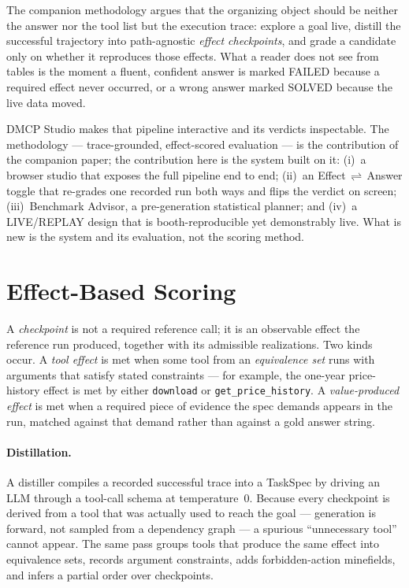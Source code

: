 \documentclass[letterpaper]{article} %
\begin{document}
The companion methodology \citep{dynamicmcpbench2026} argues that the organizing
object should be neither the answer nor the tool list but the execution trace:
explore a goal live, distill the successful trajectory into path-agnostic
\emph{effect checkpoints}, and grade a candidate only on whether it reproduces
those effects. What a reader does not see from tables is the moment a fluent,
confident answer is marked \textsf{FAILED} because a required effect never
occurred, or a wrong answer marked \textsf{SOLVED} because the live data moved.

DMCP Studio makes that pipeline interactive and its verdicts inspectable. The
methodology --- trace-grounded, effect-scored evaluation --- is the contribution
of the companion paper; the contribution here is the system built on it:
(i)~a browser studio that exposes the full pipeline end to end; (ii)~an
Effect\,$\rightleftharpoons$\,Answer toggle that re-grades one recorded run both
ways and flips the verdict on screen; (iii)~Benchmark Advisor, a pre-generation
statistical planner; and (iv)~a LIVE/REPLAY design that is booth-reproducible
yet demonstrably live. What is new is the system and its evaluation, not the
scoring method.

\section{Effect-Based Scoring}

A \emph{checkpoint} is not a required reference call; it is an observable effect
the reference run produced, together with its admissible realizations. Two kinds
occur. A \emph{tool effect} is met when some tool from an \emph{equivalence set}
runs with arguments that satisfy stated constraints --- for example, the
one-year price-history effect is met by either \texttt{download} or
\texttt{get\_price\_history}. A \emph{value-produced effect} is met when a
required piece of evidence the spec demands appears in the run, matched against
that demand rather than against a gold answer string.

\paragraph{Distillation.} A distiller compiles a recorded successful trace into
a TaskSpec by driving an LLM through a tool-call schema at temperature~0. Because
every checkpoint is derived from a tool that was actually used to reach the goal
--- generation is forward, not sampled from a dependency graph --- a spurious
``unnecessary tool'' cannot appear. The same pass groups tools that produce the
same effect into equivalence sets, records argument constraints, adds
forbidden-action minefields, and infers a partial order over checkpoints.
\end{document}
